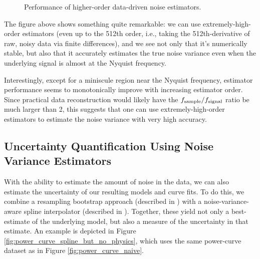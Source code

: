 \begin{figure}[!htb]
    \centering
    \caption{Performance of higher-order data-driven noise estimators.}
    \label{fig:noise_variance_higher_order}
\end{figure}


The figure above shows something quite remarkable: we can use extremely-high-order estimators (even up to the 512th order, i.e., taking the 512th-derivative of raw, noisy data via finite differences), and we see not only that it's numerically stable, but also that it accurately estimates the true noise variance even when the underlying signal is almost at the Nyquist frequency.

Interestingly, except for a miniscule region near the Nyquist frequency, estimator performance seems to monotonically improve with increasing estimator order. Since practical data reconstruction would likely have the $f_{\rm sample} / f_{\rm signal}$ ratio be much larger than 2, this suggests that one can use extremely-high-order estimators to estimate the noise variance with very high accuracy.

\subsection{Uncertainty Quantification Using Noise Variance Estimators}

With the ability to estimate the amount of noise in the data, we can also estimate the uncertainty of our resulting models and curve fits. To do this, we combine a resampling bootstrap approach (described in \cite{surrogates, elements_of_statistical_learning}) with a noise-variance-aware spline interpolator (described in \cite{surrogates, wahba}). Together, these yield not only a best-estimate of the underlying model, but also a measure of the uncertainty in that estimate. An example is depicted in Figure \ref{fig:power_curve_spline_but_no_physics}, which uses the same power-curve dataset as in Figure \ref{fig:power_curve_naive}.

